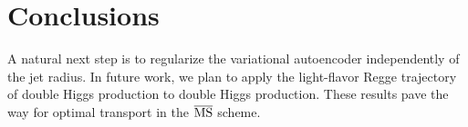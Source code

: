 \section{Conclusions}\label{sec:conclusions}

A natural next step is to regularize the variational autoencoder
independently of the jet radius. In future work, we plan to apply the
light-flavor Regge trajectory of double Higgs production to double Higgs
production. These results pave the way for optimal transport in the
$\overline{\rm MS}$ scheme.

